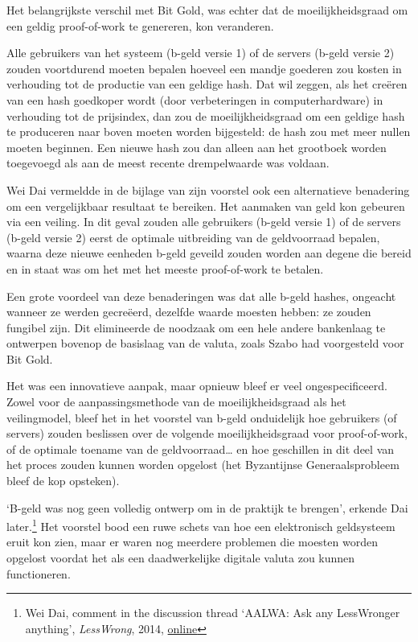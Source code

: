 \documentclass[
  a5paper,
  smalldemyvopaper,11pt,twoside,onecolumn,openright,extrafontsizes]{memoir}
\begin{document}
Het belangrijkste verschil met Bit Gold, was echter dat de
moeilijkheidsgraad om een geldig proof-of-work te genereren, kon
veranderen.

Alle gebruikers van het systeem (b-geld versie 1) of de servers (b-geld
versie 2) zouden voortdurend moeten bepalen hoeveel een mandje goederen
zou kosten in verhouding tot de productie van een geldige hash. Dat wil
zeggen, als het creëren van een hash goedkoper wordt (door verbeteringen
in computerhardware) in verhouding tot de prijsindex, dan zou de
moeilijkheidsgraad om een geldige hash te produceren naar boven moeten
worden bijgesteld: de hash zou met meer nullen moeten beginnen. Een
nieuwe hash zou dan alleen aan het grootboek worden toegevoegd als aan
de meest recente drempelwaarde was voldaan.

Wei Dai vermeldde in de bijlage van zijn voorstel ook een alternatieve
benadering om een vergelijkbaar resultaat te bereiken. Het aanmaken van
geld kon gebeuren via een veiling. In dit geval zouden alle gebruikers
(b-geld versie 1) of de servers (b-geld versie 2) eerst de optimale
uitbreiding van de geldvoorraad bepalen, waarna deze nieuwe eenheden
b-geld geveild zouden worden aan degene die bereid en in staat was om
het met het meeste proof-of-work te betalen.

Een grote voordeel van deze benaderingen was dat alle b-geld hashes,
ongeacht wanneer ze werden gecreëerd, dezelfde waarde moesten hebben: ze
zouden fungibel zijn. Dit elimineerde de noodzaak om een hele andere
bankenlaag te ontwerpen bovenop de basislaag van de valuta, zoals Szabo
had voorgesteld voor Bit Gold.

Het was een innovatieve aanpak, maar opnieuw bleef er veel
ongespecificeerd. Zowel voor de aanpassingsmethode van de
moeilijkheidsgraad als het veilingmodel, bleef het in het voorstel van
b-geld onduidelijk hoe gebruikers (of servers) zouden beslissen over de
volgende moeilijkheidsgraad voor proof-of-work, of de optimale toename
van de geldvoorraad\ldots{} en hoe geschillen in dit deel van het proces
zouden kunnen worden opgelost (het Byzantijnse Generaalsprobleem bleef
de kop opsteken).

`B-geld was nog geen volledig ontwerp om in de praktijk te brengen',
erkende Dai later.\footnote{Wei Dai, comment in the discussion thread
  `AALWA: Ask any LessWronger anything', \emph{LessWrong}, 2014,
  \href{https://www.lesswrong.com/posts/YdfpDyRpNyypivgdu/aalwa-ask-any-lesswronger-anything}{online}}
Het voorstel bood een ruwe schets van hoe een elektronisch geldsysteem
eruit kon zien, maar er waren nog meerdere problemen die moesten worden
opgelost voordat het als een daadwerkelijke digitale valuta zou kunnen
functioneren.
\end{document}
